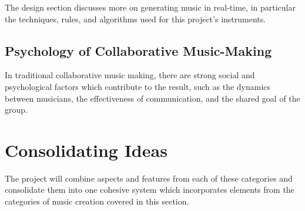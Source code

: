 The design section discusses more on generating music in real-time, in particular the techniques, rules, and algorithms used for this project’s instruments.

\subsection{Psychology of Collaborative Music-Making}
In traditional collaborative music making, there are strong social and psychological factors which contribute to the result, such as the dynamics between musicians, the effectiveness of communication, and the shared goal of the group.

\section{Consolidating Ideas}
The project will combine aspects and features from each of these categories and consolidate them into one cohesive system which incorporates elements from the categories of music creation covered in this section.
